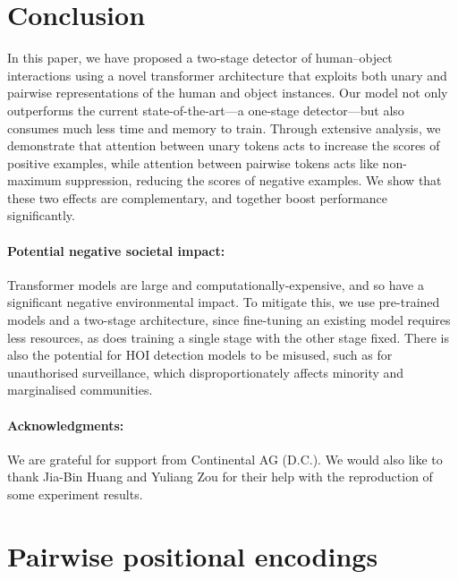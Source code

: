 \documentclass[10pt,twocolumn,letterpaper]{article}
\begin{document}
\section{Conclusion}

In this paper, we have proposed a two-stage detector of human--object interactions using a novel transformer architecture that exploits both unary and pairwise representations of the human and object instances. Our model not only outperforms the current state-of-the-art---a one-stage detector---but also consumes much less time and memory to train. Through extensive analysis, we demonstrate that attention between unary tokens acts to increase the scores of positive examples, while attention between pairwise tokens acts like non-maximum suppression, reducing the scores of negative examples. We show that these two effects are complementary, and together boost performance significantly.

\vspace{-10pt}
\paragraph{Potential negative societal impact:}
Transformer models are large and computationally-expensive, and so have a significant negative environmental impact. To mitigate this, we use pre-trained models and a two-stage architecture, since fine-tuning an existing model requires less resources, as does training a single stage with the other stage fixed. There is also the potential for HOI detection models to be misused, such as for unauthorised surveillance, which disproportionately affects minority and marginalised communities.

\vspace{-10pt}
\paragraph{Acknowledgments:}
We are grateful for support from Continental AG (D.C.). We would also like to thank Jia-Bin Huang and Yuliang Zou for their help with the reproduction of some experiment results.


\clearpage

{\small


}


\appendix

\section{Pairwise positional encodings}
\label{app:pe}
\end{document}
